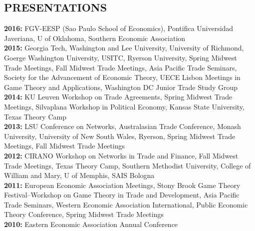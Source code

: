 \documentclass[11pt]{res}
\begin{document}
\begin{resume}
\section{PRESENTATIONS}\vspace{1.5mm}
{\bf 2016:} FGV-EESP (Sao Paulo School of Economics), Pontifica Universidad Javeriana, U of Oklahoma, Southern Economic Association\vspace{1.5mm}\\
{\bf 2015:} Georgia Tech, Washington and Lee University, University of Richmond, Goerge Washington University, USITC, Ryerson University, Spring Midwest Trade Meetings, Fall Midwest Trade Meetings, Asia Pacific Trade Seminars, Society for the Advancement of Economic Theory, UECE Lisbon Meetings in Game Theory and Applications, Washington DC Junior Trade Study Group\vspace{1.5mm}\\
{\bf 2014:} KU Leuven Workshop on Trade Agreements, Spring Midwest Trade Meetings, Silvaplana Workshop in Political Economy, Kansas State University, Texas Theory Camp\vspace{1.5mm}\\
{\bf 2013:} LSU Conference on Networks, Australasian Trade Conference, Monash University, University of New South Wales, Ryerson, Spring Midwest Trade Meetings, Fall Midwest Trade Meetings \vspace{1.5mm}\\
{\bf 2012:}  CIRANO Workshop on Networks in Trade and Finance, Fall Midwest Trade Meetings, Texas Theory Camp, Southern Methodist University, College of William and Mary, U of Memphis, SAIS Bologna\vspace{1.5mm}\\
{\bf 2011:} European Economic Association Meetings, Stony Brook Game Theory Festival--Workshop on Game Theory in Trade and Development, Asia Pacific Trade Seminars, Western Economic Association International, Public Economic Theory Conference, Spring Midwest Trade Meetings\vspace{1.5mm}\\
{\bf 2010:} Eastern Economic Association Annual Conference \vspace{1.5mm}\\



\phantom{.}\vspace{.05cm}

\end{resume}
\end{document}
